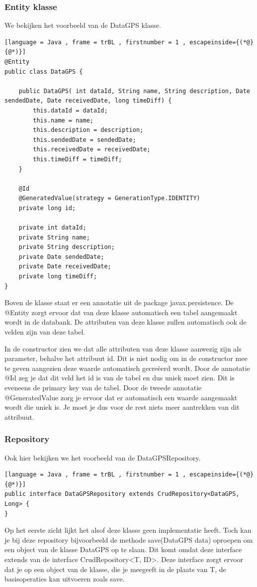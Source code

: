 \subsubsection{Entity klasse}
We bekijken het voorbeeld van de DataGPS klasse.
\begin{lstlisting}[language = Java , frame = trBL , firstnumber = 1 , escapeinside={(*@}{@*)}]
@Entity
public class DataGPS {
    
    public DataGPS( int dataId, String name, String description, Date sendedDate, Date receivedDate, long timeDiff) {
        this.dataId = dataId;
        this.name = name;
        this.description = description;
        this.sendedDate = sendedDate;
        this.receivedDate = receivedDate;
        this.timeDiff = timeDiff;
    }
    
    @Id
    @GeneratedValue(strategy = GenerationType.IDENTITY)
    private long id;
    
    private int dataId;
    private String name;
    private String description;
    private Date sendedDate;
    private Date receivedDate;
    private long timeDiff;
}
\end{lstlisting}
Boven de klasse staat er een annotatie uit de package javax.persistence. De @Entity zorgt ervoor dat van deze klasse automatisch een tabel aangemaakt wordt in de databank. De attributen van deze klasse zullen automatisch ook de velden zijn van deze tabel.

In de constructor zien we dat alle attributen van deze klasse aanwezig zijn als parameter, behalve het attribuut id. Dit is niet nodig om in de constructor mee te geven aangezien deze waarde automatisch gecreëerd wordt. Door de annotatie @Id zeg je dat dit veld het id is van de tabel en dus uniek moet zien. Dit is eveneens de primary key van de tabel. Door de tweede annotatie @GeneratedValue zorg je ervoor dat er automatisch een waarde aangemaakt wordt die uniek is. Je moet je dus voor de rest niets meer aantrekken van dit attribuut.

\subsubsection{Repository}
Ook hier bekijken we het voorbeeld van de DataGPSRepository.
\begin{lstlisting}[language = Java , frame = trBL , firstnumber = 1 , escapeinside={(*@}{@*)}]
public interface DataGPSRepository extends CrudRepository<DataGPS, Long> {
}
\end{lstlisting}
Op het eerste zicht lijkt het alsof deze klasse geen implementatie heeft. Toch kan je bij deze repository bijvoorbeeld de methode save(DataGPS data) oproepen om een object van de klasse DataGPS op te slaan. Dit komt omdat deze interface extends van de interface CrudRepository<T, ID>. Deze interface zorgt ervoor dat je op een object van de klasse, die je meegeeft in de plaats van T, de basisoperaties kan uitvoeren zoals save.

